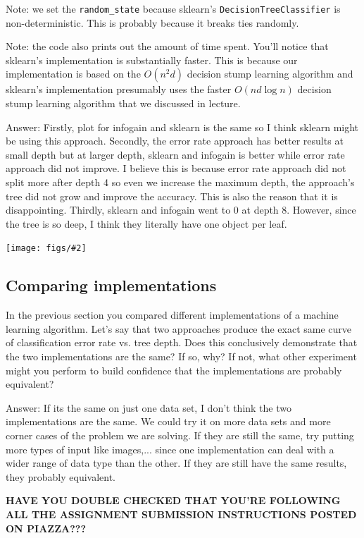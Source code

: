 \documentclass{article}
\def\ans#1{\par\gre{Answer: #1}}
\def\gre#1{{\color{gre}#1}}
\newcommand{\centerfig}[2]{\begin{center}\texttt{[image: figs/\#2]}\end{center}}
\begin{document}
  Note: we set the \verb|random_state| because sklearn's \texttt{DecisionTreeClassifier} is non-deterministic. This is probably
  because it breaks ties randomly.

  Note: the code also prints out the amount of time spent. You'll notice that sklearn's implementation is substantially faster. This is because
  our implementation is based on the $O(n^2d)$ decision stump learning algorithm and sklearn's implementation presumably uses the faster $O(nd\log n)$
  decision stump learning algorithm that we discussed in lecture.\\
  \ans{Firstly, plot for infogain and sklearn is the same so I think sklearn might be using this approach. Secondly, the error rate approach has better results at small depth
  but at larger depth, sklearn and infogain is better while error rate approach did not improve. I believe this is because error rate approach did not split more after depth 4 so even we increase the maximum depth,
  the approach's tree did not grow and improve the accuracy. This is also the reason that it is disappointing. Thirdly, sklearn and infogain went to 0 at depth 8. However, since the tree is so deep, I think they literally have one object per leaf.}\\

  \centerfig{.9}{q6_5_decisionBoundary.pdf}
  \clearpage

  \subsection{Comparing implementations}

  In the previous section you compared different implementations of a machine learning algorithm. Let's say that two
  approaches produce the exact same curve of classification error rate vs. tree depth. Does this conclusively demonstrate
  that the two implementations are the same? If so, why? If not, what other experiment might you perform to build confidence
  that the implementations are probably equivalent?
  \ans{If its the same on just one data set, I don't think the two implementations are the same. We could try it on more data sets and more corner cases of the problem we are solving.
  If they are still the same, try putting more types of input like images,... since one implementation can deal with a wider range of data type than the other. If they are still have the same results,
  they probably equivalent.}


\vspace{25pt}
\textbf{HAVE YOU DOUBLE CHECKED THAT YOU'RE FOLLOWING ALL THE ASSIGNMENT SUBMISSION INSTRUCTIONS POSTED ON PIAZZA???}
\end{document}
